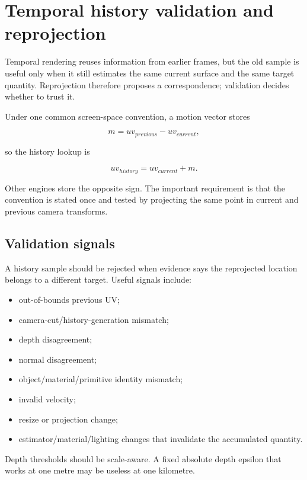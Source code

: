 \hypertarget{appendix-e8c352e39466}{}
\section{Temporal history validation and reprojection}\label{appendix-e8c352e39466-temporal-history-validation-and-reprojection}

Temporal rendering reuses information from earlier frames, but the old sample is useful only when it still estimates the same current surface and the same target quantity. Reprojection therefore proposes a correspondence; validation decides whether to trust it.

Under one common screen-space convention, a motion vector stores

\[
m = uv_{previous}-uv_{current},
\]

so the history lookup is

\[
uv_{history}=uv_{current}+m.
\]

Other engines store the opposite sign. The important requirement is that the convention is stated once and tested by projecting the same point in current and previous camera transforms.

\subsection{Validation signals}\label{appendix-e8c352e39466-validation-signals}

A history sample should be rejected when evidence says the reprojected location belongs to a different target. Useful signals include:

\begin{itemize}
\tightlist
\item
  out-of-bounds previous UV;
\item
  camera-cut/history-generation mismatch;
\item
  depth disagreement;
\item
  normal disagreement;
\item
  object/material/primitive identity mismatch;
\item
  invalid velocity;
\item
  resize or projection change;
\item
  estimator/material/lighting changes that invalidate the accumulated quantity.
\end{itemize}

Depth thresholds should be scale-aware. A fixed absolute depth epsilon that works at one metre may be useless at one kilometre.

